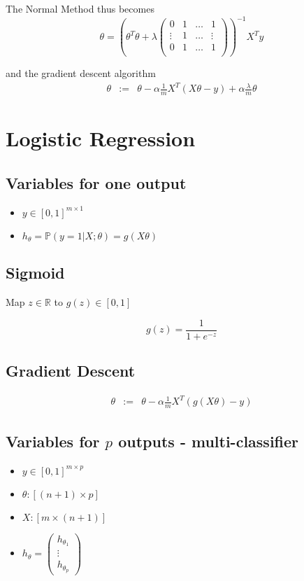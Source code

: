\documentclass[a4paper,titlepage] {scrartcl}
\begin{document}
The Normal Method thus becomes
\begin{equation}
	\theta = \left(\theta^T\theta + \lambda \begin{pmatrix}
		0 & 1 & \dots & 1\\
		\vdots & 1 & \dots & \vdots\\
		0 & 1 & \hdots & 1\\
	\end{pmatrix}\right)^{-1}X^Ty
\end{equation}

and the gradient descent algorithm
\begin{eqnarray}
	\theta &:=& \theta - \alpha\frac{1}{m}X^T(X\theta - y) + \alpha\frac{\lambda}{m}\theta
\end{eqnarray}

\section{Logistic Regression}

\subsection{Variables for one output}
\begin{itemize}
	\item $y\in[0,1]^{m\times 1}$
	\item $h_\theta = \mathbb P(y = 1 | X; \theta) = g(X\theta)$
\end{itemize}


\subsection{Sigmoid}
Map $z\in\mathbb{R}$ to $g(z)\in[0,1]$

\begin{equation}
	g(z) = \frac{1}{1+e^{-z}}
\end{equation}

\subsection{Gradient Descent}

\begin{eqnarray}
	\theta &:=& \theta - \alpha\frac{1}{m}X^T(g(X\theta) - y)
\end{eqnarray}


\subsection{Variables for $p$ outputs - multi-classifier}
\begin{itemize}
	\item $y \in [0,1]^{m\times p}$
	\item $\theta: [(n+1)\times p]$
	\item $X: [m \times (n+1)]$
	\item $h_\theta =	
	\begin{pmatrix}
		h_{\theta_1}\\
		\vdots\\
		h_{\theta_p}
	\end{pmatrix}$
\end{itemize}
\end{document}
